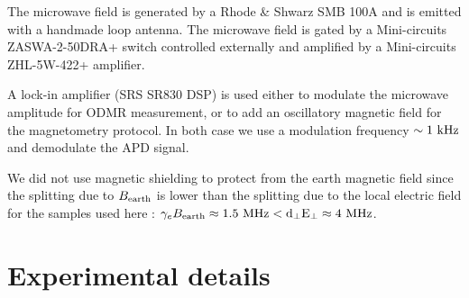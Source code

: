 \documentclass[preprintnumbers,amsmath,amssymb,onecolumn,12pt]{revtex4-2}\usepackage{graphicx}%
\begin{document}
The microwave field is generated by a Rhode \& Shwarz SMB 100A and is emitted with a handmade loop antenna. The microwave field is gated by a Mini-circuits ZASWA-2-50DRA+ switch controlled externally and amplified by a Mini-circuits ZHL-5W-422+ amplifier.

A lock-in amplifier (SRS SR830 DSP) is used either to modulate the microwave amplitude for ODMR measurement, or to add an oscillatory magnetic field for the magnetometry protocol. In both case we use a modulation frequency $\sim 1\ \rm kHz$ and demodulate the APD signal.

We did not use magnetic shielding to protect from the earth magnetic field since the splitting due to  $B_{\rm earth}$ is lower than the splitting due to the local electric field for the samples used here : $ \gamma_e B_{\rm earth} \approx 1.5\ \rm MHz < d_\perp E_\perp \approx 4\ \rm MHz$. 

\section{Experimental details}
\end{document}
